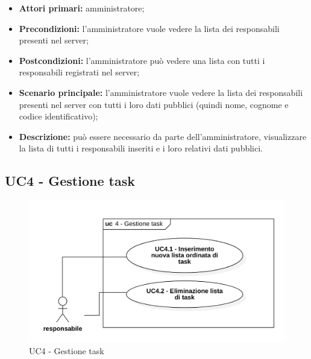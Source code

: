 \begin{itemize}
	\item 	\textbf{Attori primari:} amministratore;
	\item 	\textbf{Precondizioni:} l'amministratore vuole vedere la lista dei responsabili presenti nel server;
	\item 	\textbf{Postcondizioni:} l'amministratore può vedere una lista con tutti i responsabili registrati nel server;
	\item 	\textbf{Scenario principale:} l'amministratore vuole vedere la lista dei responsabili presenti nel server con tutti i loro dati pubblici (quindi nome, cognome e codice identificativo);
	\item 	\textbf{Descrizione:} può essere necessario da parte dell'amministratore, visualizzare la lista di tutti i responsabili inseriti e i loro relativi dati pubblici.
\end{itemize}

\subsection{UC4 - Gestione task}

\begin{figure}[H]
	\centering
	\includegraphics[scale=0.52]{res/images/uc4.png}
	\caption{UC4 - Gestione task}
\end{figure}

